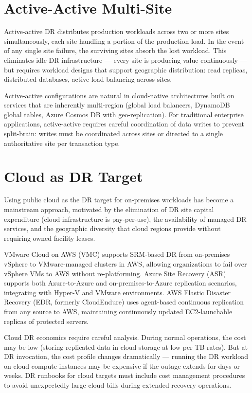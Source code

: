 \section{Active-Active Multi-Site}
Active-active DR distributes production workloads across two or more sites simultaneously, each site handling a portion of the production load. In the event of any single site failure, the surviving sites absorb the lost workload. This eliminates idle DR infrastructure --- every site is producing value continuously --- but requires workload designs that support geographic distribution: read replicas, distributed databases, active load balancing across sites.

Active-active configurations are natural in cloud-native architectures built on services that are inherently multi-region (global load balancers, DynamoDB global tables, Azure Cosmos DB with geo-replication). For traditional enterprise applications, active-active requires careful coordination of data writes to prevent split-brain: writes must be coordinated across sites or directed to a single authoritative site per transaction type.

\section{Cloud as DR Target}
Using public cloud as the DR target for on-premises workloads has become a mainstream approach, motivated by the elimination of DR site capital expenditure (cloud infrastructure is pay-per-use), the availability of managed DR services, and the geographic diversity that cloud regions provide without requiring owned facility leases.

VMware Cloud on AWS (VMC) supports SRM-based DR from on-premises vSphere to VMware-managed clusters in AWS, allowing organizations to fail over vSphere VMs to AWS without re-platforming. Azure Site Recovery (ASR) supports both Azure-to-Azure and on-premises-to-Azure replication scenarios, integrating with Hyper-V and VMware environments. AWS Elastic Disaster Recovery (EDR, formerly CloudEndure) uses agent-based continuous replication from any source to AWS, maintaining continuously updated EC2-launchable replicas of protected servers.

Cloud DR economics require careful analysis. During normal operations, the cost may be low (storing replicated data in cloud storage at low per-TB rates). But at DR invocation, the cost profile changes dramatically --- running the DR workload on cloud compute instances may be expensive if the outage extends for days or weeks. DR runbooks for cloud targets must include cost management procedures to avoid unexpectedly large cloud bills during extended recovery operations.

